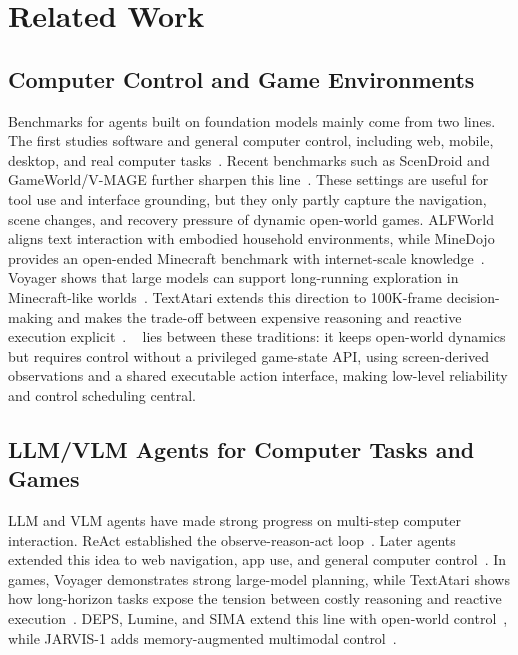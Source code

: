 \section{Related Work}
\label{sec:related_work}

\subsection{Computer Control and Game Environments}
\label{sec:related_work_computer_control}

Benchmarks for agents built on foundation models mainly come from two lines.
The first studies software and general computer control, including web,
mobile, desktop, and real computer tasks~\citep{liu2024agentbench,zhou2023webarena,tan2024cradle}.
Recent benchmarks such as ScenDroid and GameWorld/V-MAGE further sharpen this line~\citep{scendroid2026,ouyang2026gameworld,zheng2025vmage}.
These settings are useful for tool use and interface grounding, but they only
partly capture the navigation, scene changes, and recovery pressure of dynamic
open-world games.
ALFWorld aligns text interaction with embodied household environments, while
MineDojo provides an open-ended Minecraft benchmark with internet-scale
knowledge~\citep{shridhar2021alfworld,fan2022minedojo}. Voyager shows that
large models can support long-running exploration in Minecraft-like
worlds~\citep{wang2024voyager}. TextAtari extends this direction to 100K-frame
decision-making and makes the trade-off between expensive reasoning and
reactive execution explicit~\citep{textatari2025}.
\stardojo{}~\citep{tan2025stardojo} lies between these traditions: it keeps
open-world dynamics but requires control without a privileged game-state API,
using screen-derived observations and a shared executable action interface,
making low-level reliability and control scheduling central.

\subsection{LLM/VLM Agents for Computer Tasks and Games}
\label{sec:related_work_llm_vlm_agents}

LLM and VLM agents have made strong progress on multi-step computer
interaction. ReAct established the observe-reason-act loop~\citep{yao2023react}.
Later agents extended this idea to web navigation, app use, and general
computer control~\citep{zhou2023webarena,deng2023mind2web,tan2024cradle}.
In games, Voyager demonstrates strong large-model planning, while TextAtari
shows how long-horizon tasks expose the tension between costly reasoning and
reactive execution~\citep{wang2024voyager,textatari2025}.
DEPS, Lumine, and SIMA extend this line with open-world control~\citep{wang2023deps,tan2025lumine,abiraad2024scaling},
while JARVIS-1 adds memory-augmented multimodal control~\citep{wang2023jarvis1}.

